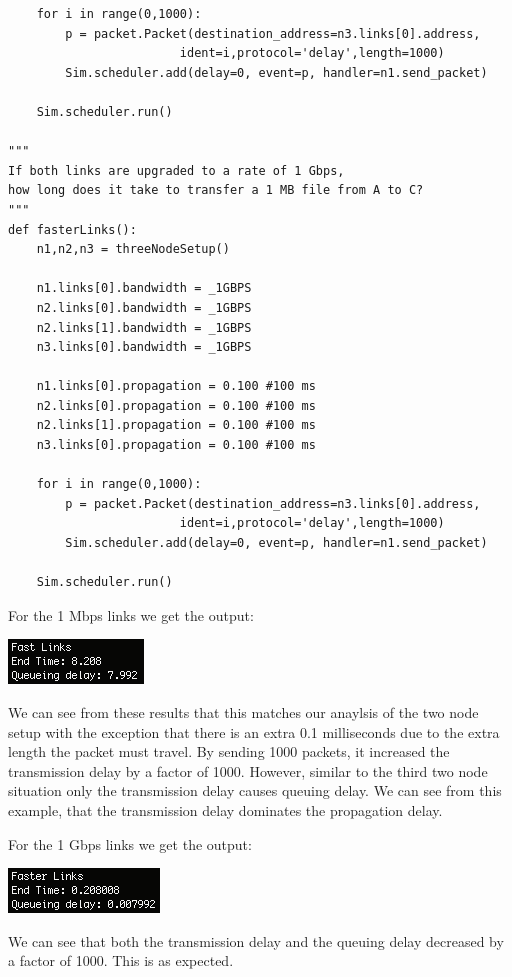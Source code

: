 \documentclass[11pt]{article}
\begin{document}
\begin{lstlisting}
    for i in range(0,1000):
        p = packet.Packet(destination_address=n3.links[0].address,
                        ident=i,protocol='delay',length=1000)
        Sim.scheduler.add(delay=0, event=p, handler=n1.send_packet)

    Sim.scheduler.run()

"""
If both links are upgraded to a rate of 1 Gbps, 
how long does it take to transfer a 1 MB file from A to C?
"""
def fasterLinks():
    n1,n2,n3 = threeNodeSetup()

    n1.links[0].bandwidth = _1GBPS
    n2.links[0].bandwidth = _1GBPS
    n2.links[1].bandwidth = _1GBPS
    n3.links[0].bandwidth = _1GBPS

    n1.links[0].propagation = 0.100 #100 ms
    n2.links[0].propagation = 0.100 #100 ms
    n2.links[1].propagation = 0.100 #100 ms
    n3.links[0].propagation = 0.100 #100 ms

    for i in range(0,1000):
        p = packet.Packet(destination_address=n3.links[0].address,
                        ident=i,protocol='delay',length=1000)
        Sim.scheduler.add(delay=0, event=p, handler=n1.send_packet)

    Sim.scheduler.run()
\end{lstlisting}
For the 1 Mbps links we get the output: 

\includegraphics{3fast.png}

We can see from these results that this matches our anaylsis of the two node setup with the exception that there is an extra 0.1 milliseconds due to the extra length the packet must travel. By sending 1000 packets, it increased the transmission delay by a factor of 1000. However, similar to the third two node situation only the transmission delay causes queuing delay. We can see from this example, that the transmission delay dominates the propagation delay.

For the 1 Gbps links we get the output:

\includegraphics{3faster.png}

We can see that both the transmission delay and the queuing delay decreased by a factor of 1000. This is as expected.
\end{document}
